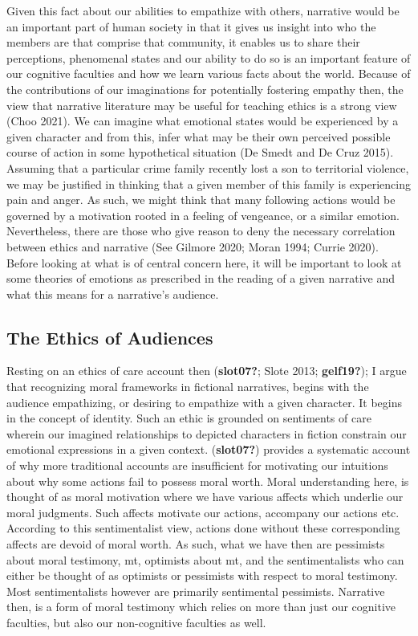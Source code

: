 \documentclass[12pt]{book}
\theoremstyle{definition}
\theoremstyle{remark}
\begin{document}
Given this fact about our abilities to empathize with others, narrative would be an important part of human society in that it gives us insight into who the members are that comprise that community, it enables us to share their perceptions, phenomenal states and our ability to do so is an important feature of our cognitive faculties and how we learn various facts about the world. Because of the contributions of our imaginations for potentially fostering empathy then, the view that narrative literature may be useful for teaching ethics is a strong view (Choo 2021). We can imagine what emotional states would be experienced by a given character and from this, infer what may be their own perceived possible course of action in some hypothetical situation (De Smedt and De Cruz 2015). Assuming that a particular crime family recently lost a son to territorial violence, we may be justified in thinking that a given member of this family is experiencing pain and anger. As such, we might think that many following actions would be governed by a motivation rooted in a feeling of vengeance, or a similar emotion. Nevertheless, there are those who give reason to deny the necessary correlation between ethics and narrative (See Gilmore 2020; Moran 1994; Currie 2020). Before looking at what is of central concern here, it will be important to look at some theories of emotions as prescribed in the reading of a given narrative and what this means for a narrative's audience.

\subsection*{The Ethics of Audiences}\label{the-ethics-of-audiences}

Resting on an ethics of care account then (\textbf{slot07?}; Slote 2013; \textbf{gelf19?}); I argue that recognizing moral frameworks in fictional narratives, begins with the audience empathizing, or desiring to empathize with a given character. It begins in the concept of identity. Such an ethic is grounded on sentiments of care wherein our imagined relationships to depicted characters in fiction constrain our emotional expressions in a given context. (\textbf{slot07?}) provides a systematic account of why more traditional accounts are insufficient for motivating our intuitions about why some actions fail to possess moral worth. Moral understanding here, is thought of as moral motivation where we have various affects which underlie our moral judgments. Such affects motivate our actions, accompany our actions etc. According to this sentimentalist view, actions done without these corresponding affects are devoid of moral worth. As such, what we have then are pessimists about moral testimony, mt, optimists about mt, and the sentimentalists who can either be thought of as optimists or pessimists with respect to moral testimony. Most sentimentalists however are primarily sentimental pessimists. Narrative then, is a form of moral testimony which relies on more than just our cognitive faculties, but also our non-cognitive faculties as well.
\end{document}
